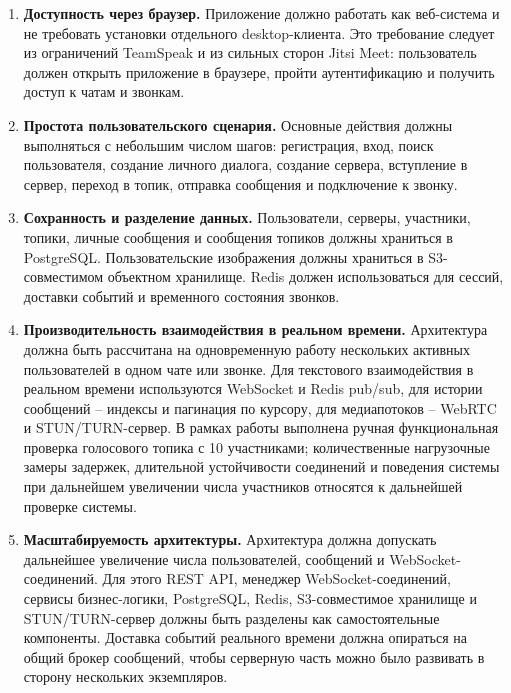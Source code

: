 \documentclass[a4paper,12pt]{extarticle}
\begin{document}
\begin{enumerate}
    \item [NF-1] \textbf{Доступность через браузер.} Приложение должно работать как веб-система и не требовать установки отдельного desktop-клиента. Это требование следует из ограничений TeamSpeak и из сильных сторон Jitsi Meet: пользователь должен открыть приложение в браузере, пройти аутентификацию и получить доступ к чатам и звонкам.

    \item [NF-2] \textbf{Простота пользовательского сценария.} Основные действия должны выполняться с небольшим числом шагов: регистрация, вход, поиск пользователя, создание личного диалога, создание сервера, вступление в сервер, переход в топик, отправка сообщения и подключение к звонку.

    \item [NF-3] \textbf{Сохранность и разделение данных.} Пользователи, серверы, участники, топики, личные сообщения и сообщения топиков должны храниться в PostgreSQL. Пользовательские изображения должны храниться в S3-совместимом объектном хранилище. Redis должен использоваться для сессий, доставки событий и временного состояния звонков.

    \item [NF-4] \textbf{Производительность взаимодействия в реальном времени.} Архитектура должна быть рассчитана на одновременную работу нескольких активных пользователей в одном чате или звонке. Для текстового взаимодействия в реальном времени используются WebSocket и Redis pub/sub, для истории сообщений -- индексы и пагинация по курсору, для медиапотоков -- WebRTC и STUN/TURN-сервер. В рамках работы выполнена ручная функциональная проверка голосового топика с 10 участниками; количественные нагрузочные замеры задержек, длительной устойчивости соединений и поведения системы при дальнейшем увеличении числа участников относятся к дальнейшей проверке системы.

    \item [NF-5] \textbf{Масштабируемость архитектуры.} Архитектура должна допускать дальнейшее увеличение числа пользователей, сообщений и WebSocket-соединений. Для этого REST API, менеджер WebSocket-соединений, сервисы бизнес-логики, PostgreSQL, Redis, S3-совместимое хранилище и STUN/TURN-сервер должны быть разделены как самостоятельные компоненты. Доставка событий реального времени должна опираться на общий брокер сообщений, чтобы серверную часть можно было развивать в сторону нескольких экземпляров.


\end{enumerate}
\end{document}

